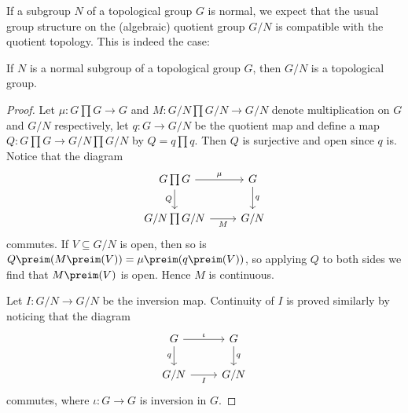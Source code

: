 \documentclass[article, a4paper, 11pt, oneside]{memoir}
\numberwithin{equation}{chapter}
\begin{document}
If a subgroup $N$ of a topological group $G$ is normal, we expect that the usual group structure on the (algebraic) quotient group $G/N$ is compatible with the quotient topology. This is indeed the case:

\begin{theorem}
    \label{thm:topological-quotient-group}
    If $N$ is a normal subgroup of a topological group $G$, then $G/N$ is a topological group.
\end{theorem}

\begin{proof}
    Let $\mu \colon G \prod G \to G$ and $M \colon G/N \prod G/N \to G/N$ denote multiplication on $G$ and $G/N$ respectively, let $q \colon G \to G/N$ be the quotient map and define a map $Q \colon G \prod G \to G/N \prod G/N$ by $Q = q \prod q$. Then $Q$ is surjective and open since $q$ is. Notice that the diagram
    \begin{equation*}
        \begin{tikzcd}
            G \prod G
                \ar[r, "\mu"]
                \ar[d, "Q", swap]
            & G
                \ar[d, "q"]
            \\
            G/N \prod G/N
                \ar[r, "M", swap]
            & G/N
        \end{tikzcd}
    \end{equation*}
    commutes. If $V \subseteq G/N$ is open, then so is $Q\preim(M\preim(V)) = \mu\preim(q\preim(V))$, so applying $Q$ to both sides we find that $M\preim(V)$ is open. Hence $M$ is continuous.

    Let $I \colon G/N \to G/N$ be the inversion map. Continuity of $I$ is proved similarly by noticing that the diagram
    \begin{equation*}
        \begin{tikzcd}
            G
                \ar[r, "\iota"]
                \ar[d, "q", swap]
            & G
                \ar[d, "q"]
            \\
            G/N
                \ar[r, "I", swap]
            & G/N
        \end{tikzcd}
    \end{equation*}
    commutes, where $\iota \colon G \to G$ is inversion in $G$.
\end{proof}
\end{document}
